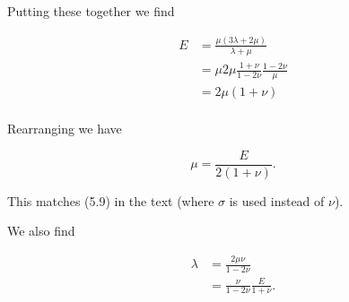 Putting these together we find

\begin{align*}
E 
&= \frac{\mu(3 \lambda + 2 \mu)}{\lambda + \mu } \\
&= \mu 2 \mu \frac{ 1 + \nu} { 1 - 2 \nu } \frac{ 1 - 2 \nu}{\mu} \\
&= 2 \mu ( 1 + \nu ) \\
\end{align*}

Rearranging we have

\begin{equation}\label{eqn:continuumL6:530}
\mu = \frac{E}{2 (1 + \nu)}.
\end{equation}

This matches (5.9) in the text (where $\sigma$ is used instead of $\nu$).

We also find

\begin{align*}
\lambda 
&= \frac{ 2 \mu \nu} { 1 - 2 \nu } \\
&= \frac{ \nu} { 1 - 2 \nu } \frac{E }{1 + \nu}.
\end{align*}

